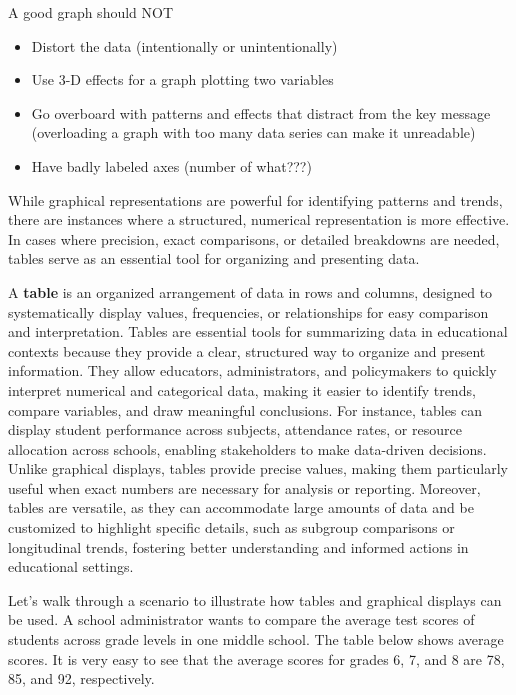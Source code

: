 \documentclass[
  letterpaper,
  DIV=11,
  numbers=noendperiod]{scrreprt}
\providecommand{\tightlist}{%
  \setlength{\itemsep}{0pt}\setlength{\parskip}{0pt}}
\begin{document}
A good graph should NOT

\begin{itemize}
\tightlist
\item
  Distort the data (intentionally or unintentionally)
\item
  Use 3-D effects for a graph plotting two variables
\item
  Go overboard with patterns and effects that distract from the key
  message (overloading a graph with too many data series can make it
  unreadable)
\item
  Have badly labeled axes (number of what???)
\end{itemize}

While graphical representations are powerful for identifying patterns
and trends, there are instances where a structured, numerical
representation is more effective. In cases where precision, exact
comparisons, or detailed breakdowns are needed, tables serve as an
essential tool for organizing and presenting data.

A \textbf{table} is an organized arrangement of data in rows and
columns, designed to systematically display values, frequencies, or
relationships for easy comparison and interpretation. Tables are
essential tools for summarizing data in educational contexts because
they provide a clear, structured way to organize and present
information. They allow educators, administrators, and policymakers to
quickly interpret numerical and categorical data, making it easier to
identify trends, compare variables, and draw meaningful conclusions. For
instance, tables can display student performance across subjects,
attendance rates, or resource allocation across schools, enabling
stakeholders to make data-driven decisions. Unlike graphical displays,
tables provide precise values, making them particularly useful when
exact numbers are necessary for analysis or reporting. Moreover, tables
are versatile, as they can accommodate large amounts of data and be
customized to highlight specific details, such as subgroup comparisons
or longitudinal trends, fostering better understanding and informed
actions in educational settings.

Let's walk through a scenario to illustrate how tables and graphical
displays can be used. A school administrator wants to compare the
average test scores of students across grade levels in one middle
school. The table below shows average scores. It is very easy to see
that the average scores for grades 6, 7, and 8 are 78, 85, and 92,
respectively.
\end{document}
